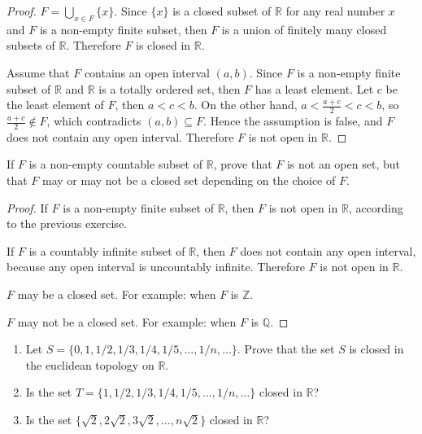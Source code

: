\begin{proof}
    $F = \bigcup_{x\in F}\{ x \}$. Since $\{ x \}$ is a closed subset of $\mathbb{R}$ for any real number $x$ and $F$ is a non-empty finite subset, then $F$ is a union of finitely many closed subsets of $\mathbb{R}$. Therefore $F$ is closed in $\mathbb{R}$.

    Assume that $F$ contains an open interval $(a, b)$. Since $F$ is a non-empty finite subset of $\mathbb{R}$ and $\mathbb{R}$ is a totally ordered set, then $F$ has a least element. Let $c$ be the least element of $F$, then $a < c < b$. On the other hand, $a < \frac{a+c}{2} < c < b$, so $\frac{a+c}{2}\notin F$, which contradicts $(a, b)\subseteq F$. Hence the assumption is false, and $F$ does not contain any open interval. Therefore $F$ is not open in $\mathbb{R}$.
\end{proof}
\newpage

\begin{exercise}
    If $F$ is a non-empty countable subset of $\mathbb{R}$, prove that $F$ is not an open set, but that $F$ may or may not be a closed set depending on the choice of $F$.
\end{exercise}

\begin{proof}
    If $F$ is a non-empty finite subset of $\mathbb{R}$, then $F$ is not open in $\mathbb{R}$, according to the previous exercise.

    If $F$ is a countably infinite subset of $\mathbb{R}$, then $F$ does not contain any open interval, because any open interval is uncountably infinite. Therefore $F$ is not open in $\mathbb{R}$.

    $F$ may be a closed set. For example: when $F$ is $\mathbb{Z}$.

    $F$ may not be a closed set. For example: when $F$ is $\mathbb{Q}$.
\end{proof}
\newpage

\begin{exercise}
    \begin{enumerate}[label={(\roman*)}]
        \item Let $S = \{ 0, 1, 1/2, 1/3, 1/4, 1/5, \ldots, 1/n, \ldots \}$. Prove that the set $S$ is closed in the euclidean topology on $\mathbb{R}$.
        \item Is the set $T = \{ 1, 1/2, 1/3, 1/4, 1/5, \ldots, 1/n, \ldots \}$ closed in $\mathbb{R}$?
        \item Is the set $\{ \sqrt{2}, 2\sqrt{2}, 3\sqrt{2}, \ldots, n\sqrt{2} \}$ closed in $\mathbb{R}$?
    \end{enumerate}
\end{exercise}

